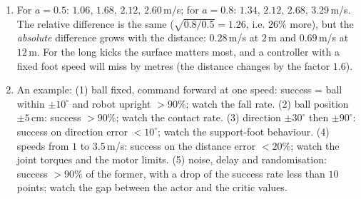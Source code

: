 \begin{enumerate}[label=\textbf{\ansnum.\arabic*}]
  \item For $a=0.5$: $1.06,\,1.68,\,2.12,\,2.60$\,m/s; for $a=0.8$: $1.34,\,2.12,\,2.68,\,3.29$\,m/s. The relative difference is the same ($\sqrt{0.8/0.5}=1.26$, i.e. $26\%$ more), but the \emph{absolute} difference grows with the distance: $0.28$\,m/s at $2$\,m and $0.69$\,m/s at $12$\,m. For the long kicks the surface matters most, and a controller with a fixed foot speed will miss by metres (the distance changes by the factor $1.6$).
  \item An example: (1) ball fixed, command forward at one speed: success = ball within $\pm10^{\circ}$ and robot upright $>90\%$; watch the fall rate. (2) ball position $\pm5$\,cm: success $>90\%$; watch the contact rate. (3) direction $\pm30^{\circ}$ then $\pm90^{\circ}$: success on direction error $<10^{\circ}$; watch the support-foot behaviour. (4) speeds from $1$ to $3.5$\,m/s: success on the distance error $<20\%$; watch the joint torques and the motor limits. (5) noise, delay and randomisation: success $>90\%$ of the former, with a drop of the success rate less than $10$ points; watch the gap between the actor and the critic values.
\end{enumerate}
